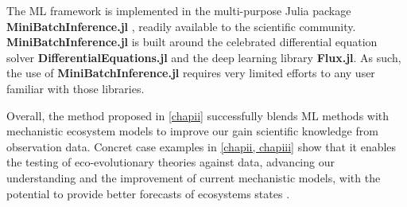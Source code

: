 The ML framework is implemented in the multi-purpose Julia package \textbf{MiniBatchInference.jl} \cite{MiniBatchInference}, readily available to the scientific community. \textbf{MiniBatchInference.jl} is built around the celebrated differential equation solver \textbf{DifferentialEquations.jl} and the deep learning library \textbf{Flux.jl}. As such, the use of \textbf{MiniBatchInference.jl} requires very limited efforts to any user familiar with those libraries.

Overall, the method proposed in \cref{chapii} successfully blends ML methods with mechanistic ecosystem models to improve our gain scientific knowledge from observation data. Concret case examples in \cref{chapii, chapiii} show that it enables the testing of eco-evolutionary theories against data, advancing our understanding and the improvement of current mechanistic models, with the potential to provide better forecasts of ecosystems states \cite{Urban2016}.


\printbibliography[heading=subbibliography]






